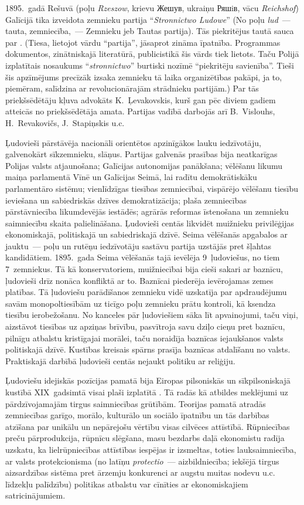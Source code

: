 \documentclass[twoside,a5paper,12pt,fleqn,openany]{extbook}
\newcommand{\pltxti}[1]{\textit{\textpolish{#1}}}
\newcommand{\rutxti}[1]{\textrussian{#1}}
\newcommand{\detxti}[1]{\textit{\textgerman{#1}}}
\newcommand{\latxti}[1]{\textit{\textlatin{#1}}}
\newcommand{\uktxti}[1]{\textukrainian{#1}}
\begin{document}
1895.~gadā Rešuvā (poļu \pltxti{Rzeszow}, krievu \rutxti{Жешув}, ukraiņu \uktxti{Ряшiв}, vācu \detxti{Reichshof}) Galīcijā tika izveidota zemnieku partija ``\pltxti{Stronnictwo Ludowe}'' (No poļu \pltxti{lud}~--- tauta, zemniecība,~--- Zemnieku jeb Tautas partija). Tās piekritējus tautā sauca par . (Tiesa, lietojot vārdu ``partija'', jāsaprot zināma īpatnība. Programmas dokumentos, zinātniskajā literatūrā, publicistikā šis vārds tiek lietots. Taču Polijā izplatītais nosaukums ``\pltxti{stronnictwo}'' burtiski nozīmē ``piekritēju savienība''. Tieši šis apzīmējums precīzāk izsaka zemnieku tā laika organizētības pakāpi, ja to, piemēram, salīdzina ar revolucionārajām strādnieku partijām.) Par tās priekšsēdētāju kļuva advokāts K.~Ļevakovskis, kurš gan pēc diviem gadiem atteicās no priekšsēdētāja amata. Partijas vadībā darbojās arī B.~Vislouhs, H.~Revakovičs, J.~Stapiņskis u.c.

Ļudovieši pārstāvēja nacionāli orientētos apzinīgākos lauku iedzīvotāju, galvenokārt sīkzemnieku, slāņus. Partijas galvenās prasības bija neatkarīgas Polijas valsts atjaunošana; Galīcijas autonomijas panākšana; vēlēšanu likumu maiņa parlamentā Vīnē un Galīcijas Seimā, lai radītu demokrātiskāku parlamentāro sistēmu; vienlīdzīgas tiesības zemniecībai, vispārējo vēlēšanu tiesību ieviešana un sabiedriskās dzīves demokratizācija; plaša zemniecības pārstāvniecība likumdevējās iestādēs; agrārās reformas īstenošana un zemnieku saimniecību skaita palielināšana. Ļudovieši centās likvidēt muižnieku privilēģijas ekonomiskajā, politiskajā un sabiedriskajā dzīvē. Seima vēlēšanās apgabalos ar jauktu~--- poļu un rutēņu iedzīvotāju sastāvu partija uzstājās pret šļahtas kandidātiem. 1895.~gada Seima vēlēšanās tajā ievēlēja 9~ļudoviešus, no tiem 7~zemniekus. Tā kā konservatoriem, muižniecībai bija cieši sakari ar baznīcu, ļudovieši drīz nonāca konfliktā ar to. Baznīcai piederēja ievērojamas zemes platības. Tā ļudoviešu parādīšanos zemnieku vidē uzskatīja par apdraudējumu savām monopoltiesībām uz ticīgo poļu zemnieku prātu kontroli, kā ksendza tiesību ierobežošanu. No kanceles pār ļudoviešiem sāka līt apvainojumi, taču viņi, aizstāvot tiesības uz apziņas brīvību, pasvītroja savu dziļo cieņu pret baznīcu, pilnīgu atbalstu kristīgajai morālei, taču noraidīja baznīcas iejaukšanos valsts politiskajā dzīvē. Kustības kreisais spārns prasīja baznīcas atdalīšanu no valsts. Praktiskajā darbībā ļudovieši centās nejaukt politiku ar reliģiju.

Ļudoviešu idejiskās pozīcijas pamatā bija Eiropas pilsoniskās un sīkpilsoniskajā kustībā XIX~gadsimtā visai plaši izplatītā . Tā radās kā atbildes meklējumi uz pārdzīvojamajām tirgus saimniecības grūtībām. Teorijas pamatā atradās zemniecības garīgo, morālo, kulturālo un sociālo īpatnību un tās darbības atzīšana par unikālu un nepārejošu vērtību visas cilvēces attīstībā. Rūpniecības preču pārprodukcija, rūpnīcu slēgšana, masu bezdarbs daļā ekonomistu radīja uzskatu, ka lielrūpniecības attīstības iespējas ir izsmeltas, toties lauksaimniecība, ar valsts protekcionisma (no latīņu \latxti{protectio}~--- aizbildniecība; iekšējā tirgus aizsardzības sistēma pret ārzemju konkurenci ar augstu muitas nodevu u.c. līdzekļu palīdzību) politikas atbalstu var cīnīties ar ekonomiskajiem satricinājumiem.
\end{document}
